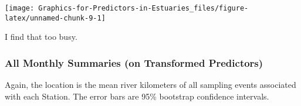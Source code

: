 \documentclass[
]{article}
\begin{document}
\begin{center}\texttt{[image: Graphics-for-Predictors-in-Estuaries\_files/figure-latex/unnamed-chunk-9-1]} \end{center}

I find that too busy.

\hypertarget{all-monthly-summaries-on-transformed-predictors}{%
\subsubsection{All Monthly Summaries (on Transformed
Predictors)}\label{all-monthly-summaries-on-transformed-predictors}}

Again, the location is the mean river kilometers of all sampling events
associated with each Station. The error bars are 95\% bootstrap
confidence intervals.
\end{document}
